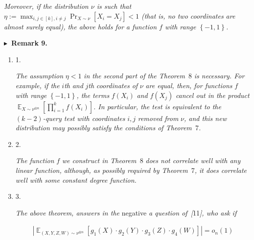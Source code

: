 \documentclass[10pt,a4paper]{article}
\begin{document}
\emph{Moreover, if the distribution $\nu$ is such that $\eta:=\max_{i,j\in[k],i\not=j}\Pr_{X\sim\nu}\left[X_{i}=X_{j}\right]<1$ (that is, no two coordinates are almost surely equal), the above holds for a function $f$ with range $\left\{-1,1\right\}$.}\par







\par\medskip\noindent\textbf{
$\blacktriangleright$ Remark 9.
}\par



\begin{enumerate}


\item[] 
1. 


\emph{The assumption }$\eta<1$\emph{ in the second part of the Theorem }8\emph{ is necessary.
For example, if the }$i$\emph{th}\emph{ and }$j$\emph{th}\emph{ coordinates of }$\nu$\emph{ are equal, then, for functions }$f$\emph{ with range }$\left\{-1,1\right\}$\emph{, the terms }$f(X_{i})$\emph{ and }$f(X_{j})$\emph{ cancel out in the product }$\mathop{\mathbb{E}}_{X\sim\nu^{\otimes n}}\left[\prod_{i=1}^{k}f(X_{i})\right]$\emph{.
In particular, the test is equivalent to the }$(k-2)$\emph{-query test with coordinates }$i,j$\emph{ removed from }$\nu$\emph{, and this new distribution may possibly satisfy the conditions of Theorem }7\emph{.}\par





\item[] 
2. 


\emph{The function }$f$\emph{ we construct in Theorem }8\emph{ does not correlate well with any linear function, although, as possibly required by Theorem }7\emph{, it does correlate well with some constant degree function.}\par





\item[] 
3. 


\emph{The above theorem, answers in the }negative\emph{ a question of }\emph{[}11\emph{]}\emph{, who ask if}\par


\[\begin{gathered}
\left|\mathop{\mathbb{E}}_{(X,Y,Z,W)\sim\nu^{\otimes n}}\left[g_{1}(X)\cdot g_{2}(Y)\cdot g_{3}(Z)\cdot g_{4}(W)\right]\right|=o_{n}(1)
\end{gathered}\]



\end{enumerate}
\end{document}

